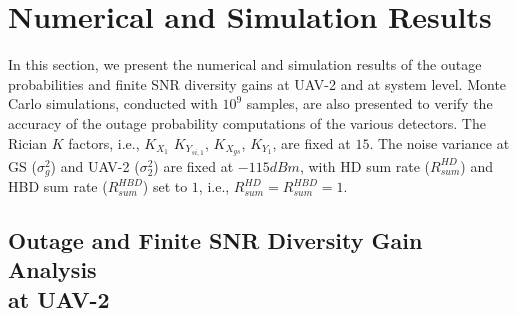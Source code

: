 \section{Numerical and Simulation Results} \label{JD_HBD_UCS_num_results_sec}

In this section, we present the numerical and simulation results of the outage probabilities and finite SNR diversity gains at UAV-2 and at system level. Monte Carlo simulations, conducted with $10^{9}$ samples, are also presented to verify the accuracy of the outage probability computations of the various detectors. The Rician $K$ factors, i.e., $K_{X_1}$ $K_{Y_{si,1}}$, $K_{X_{gs}}$, $K_{Y_1}$, are fixed at $15$. The noise variance at GS ($\sigma_g^2$) and UAV-2 ($\sigma_2^2$) are fixed at $-115dBm$, with HD sum rate ($R_{sum}^{HD}$) and HBD sum rate ($R_{sum}^{HBD}$) set to $1$, i.e., $R_{sum}^{HD}=R_{sum}^{HBD}=1$.

\subsection{Outage and Finite SNR Diversity Gain Analysis \\ at UAV-2}





